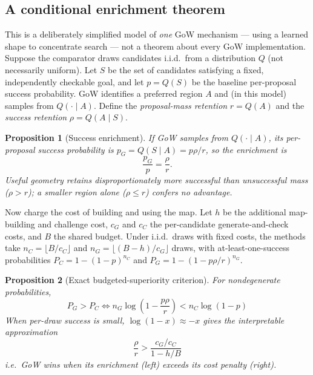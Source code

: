 \documentclass[11pt]{article}
\theoremstyle{gowthm}
\theoremstyle{gowplain}
\newtheorem{proposition}{Proposition}[section]
\begin{document}
\subsection{A conditional enrichment theorem}
\label{sec:superiority-thm}
This is a deliberately simplified model of \emph{one} GoW mechanism --- using a
learned shape to concentrate search --- not a theorem about every GoW
implementation. Suppose the comparator draws candidates i.i.d.\ from a
distribution $Q$ (not necessarily uniform). Let $S$ be the set of candidates
satisfying a fixed, independently checkable goal, and let $p = Q(S)$ be the
baseline per-proposal success probability. GoW identifies a preferred region
$A$ and (in this model) samples from $Q(\cdot \mid A)$. Define the
\emph{proposal-mass retention} $r = Q(A)$ and the \emph{success retention}
$\rho = Q(A \mid S)$.

\begin{proposition}[Success enrichment]
\label{prop:enrichment}
If GoW samples from $Q(\cdot \mid A)$, its per-proposal success probability is
$p_G = Q(S \mid A) = p\rho/r$, so the enrichment is
\[
  \frac{p_G}{p} = \frac{\rho}{r}.
\]
Useful geometry retains disproportionately more successful than unsuccessful
mass ($\rho > r$); a smaller region alone ($\rho \le r$) confers no advantage.
\end{proposition}

Now charge the cost of building and using the map. Let $h$ be the additional
map-building and challenge cost, $c_G$ and $c_C$ the per-candidate
generate-and-check costs, and $B$ the shared budget. Under i.i.d.\ draws with
fixed costs, the methods take $n_C = \lfloor B/c_C \rfloor$ and
$n_G = \lfloor (B-h)/c_G \rfloor$ draws, with at-least-one-success
probabilities $P_C = 1 - (1-p)^{n_C}$ and $P_G = 1 - (1 - p\rho/r)^{n_G}$.

\begin{proposition}[Exact budgeted-superiority criterion]
\label{prop:exact}
For nondegenerate probabilities,
\[
  \boxed{\;P_G > P_C \iff n_G \log\!\left(1 - \frac{p\rho}{r}\right) < n_C \log(1-p)\;}
\]
When per-draw success is small, $\log(1-x) \approx -x$ gives the interpretable
approximation
\[
  \boxed{\;\frac{\rho}{r} > \frac{c_G/c_C}{1 - h/B}\;}
\]
i.e.\ GoW wins when its enrichment (left) exceeds its cost penalty (right).
\end{proposition}
\end{document}
